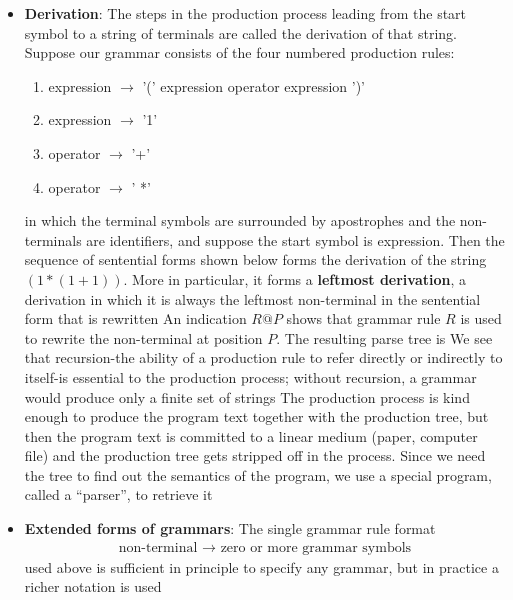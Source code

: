 \documentclass{report}
\begin{document}
\begin{itemize}
        \item \textbf{Derivation}: The steps in the production process leading from the start symbol to a string of terminals are called the derivation of that string. Suppose our grammar consists of the four numbered production rules:
            \begin{enumerate}
                \item expression $\to$ ’(’ expression operator expression ’)’
                \item expression $\to$ ’1’
                \item operator $\to$ ’+’
                \item operator $\to$ ’ *’
            \end{enumerate}
            in which the terminal symbols are surrounded by apostrophes and the non-terminals are identifiers, and suppose the start symbol is expression. Then the sequence of sentential forms shown below
            \bigbreak \noindent 
            \bigbreak \noindent 
            forms the derivation of the string $(1*(1+1))$. More in particular, it forms a \textbf{leftmost derivation}, a derivation in which it is always the leftmost non-terminal in the sentential form that is rewritten
            \bigbreak \noindent 
            An indication $R@P$ shows that grammar rule $R$ is used to rewrite the non-terminal at position $P$. The resulting parse tree is 
            \bigbreak \noindent 
            \bigbreak \noindent 
            We see that recursion-the ability of a production rule to refer directly or indirectly to itself-is essential to the production process; without recursion, a grammar would produce only a finite set of strings
            \bigbreak \noindent 
            The production process is kind enough to produce the program text together with the production tree, but then the program text is committed to a linear medium (paper, computer file) and the production tree gets stripped off in the process. Since we need the tree to find out the semantics of the program, we use a special program, called a “parser”, to retrieve it
        \item \textbf{Extended forms of grammars}: The single grammar rule format
            \begin{align*}
                \text{non-terminal } \to \text{ zero or more grammar symbols}
            \end{align*}
            used above is sufficient in principle to specify any grammar, but in practice a richer notation is used

\end{itemize}
\end{document}
